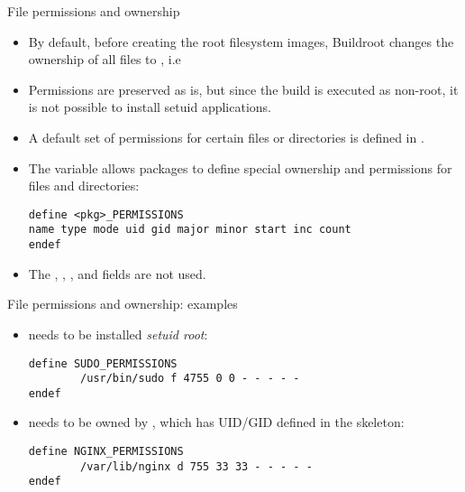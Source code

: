 \begin{frame}[fragile]{File permissions and ownership}

\begin{itemize}

\item By default, before creating the root filesystem images,
  Buildroot changes the ownership of all files to , i.e
\item Permissions are preserved as is, but since the build is executed
  as non-root, it is not possible to install setuid applications.
\item A default set of permissions for certain files or directories is
  defined in .
\item The  variable allows packages to define
  special ownership and permissions for files and directories:
{\small
  \begin{block}{}
\begin{verbatim}
define <pkg>_PERMISSIONS
name type mode uid gid major minor start inc count
endef
\end{verbatim}
  \end{block}}
\item The , , ,  and
   fields are not used.

\end{itemize}

\end{frame}

\begin{frame}[fragile]{File permissions and ownership: examples}

  \begin{itemize}
  \item {} needs to be installed {\em setuid root}:
  \begin{block}{}
    \begin{verbatim}
define SUDO_PERMISSIONS
        /usr/bin/sudo f 4755 0 0 - - - - -
endef
\end{verbatim}
\end{block}

\item {} needs to be owned by ,
  which has UID/GID  defined in the skeleton:

\begin{block}{}
  \begin{verbatim}
define NGINX_PERMISSIONS
        /var/lib/nginx d 755 33 33 - - - - -
endef
\end{verbatim}
\end{block}

\end{itemize}

\end{frame}

